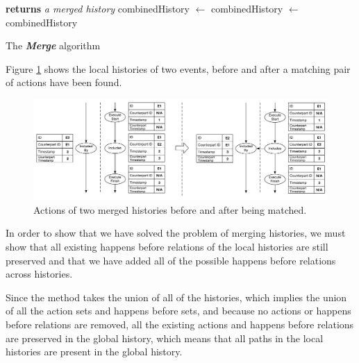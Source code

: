 	\begin{algorithm}[H]
		\begin{algorithmic}
			 \textbf{returns} \textit{a merged history}
			\State combinedHistory $\leftarrow$ 
						\State combinedHistory $\leftarrow$                     	
                    \EndIf
                \EndFor
			\EndIf
			\EndFor
			\State\Return combinedHistory
			\EndFunction
		\end{algorithmic}
		\caption{The \textit{\textbf{Merge}} algorithm}
		\label{alg:merge}
	\end{algorithm}
	
    \noindent Figure \ref{fig:connecting:match-before-after} shows the local histories of two events, before and after a matching pair of actions have been found.
    
	\begin{figure}[H]
		\centering
		\includegraphics[width=\textwidth]{4connect/images/match-before-after.pdf}
		\caption{Actions of two merged histories before and after being matched.}
		\label{fig:connecting:match-before-after}
	\end{figure}
	
    \noindent In order to show that we have solved the problem of merging histories, we must show that all existing happens before relations of the local histories are still preserved and that we have added all of the possible happens before relations across histories.
    
    \newpar Since the method takes the union of all of the histories, which implies the union of all the action sets and happens before sets, and because no actions or happens before relations are removed, all the existing actions and happens before relations are preserved in the global history, which means that all paths in the local histories are present in the global history.
    
